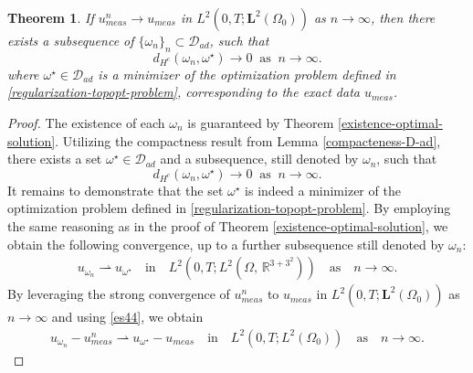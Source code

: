 \documentclass[a4paper,12pt,reqno,natbib]{amsart}
\newtheorem{theorem}{Theorem}
\def\L{\textbf{L}}
\begin{document}
\begin{theorem}\label{theorem-stability} If
$u_{meas}^n \longrightarrow u_{meas}$ in $L^2(0,T;\L^2(\Omega_0))$ as $n\longrightarrow \infty$, then there exists a subsequence of $\{\omega_n\}_n\subset\mathcal{D}_{ad}$, such that
$$d_{H^c}(\omega_n,\omega^\star)\longrightarrow0\;\; \text{as}\;\; n\longrightarrow\infty.$$
where $\omega^\star\in\mathcal{D}_{ad}$ is a minimizer of the optimization problem defined in \eqref{regularization-topopt-problem}, corresponding to the exact data $u_{meas}$.
\end{theorem}

\begin{proof}
The existence of each $\omega_n$ is guaranteed by Theorem \ref{existence-optimal-solution}. Utilizing the compactness result from Lemma \ref{compacteness-D-ad}, there exists a set $\omega^\star\in\mathcal{D}_{ad}$ and a subsequence, still denoted by $\omega_n$, such that
$$d_{H^c}(\omega_n,\omega^\star)\longrightarrow0\;\; \text{as}\;\; n\longrightarrow\infty.$$
It remains to demonstrate that the set $\omega^\star$ is indeed a minimizer of the optimization problem defined in \eqref{regularization-topopt-problem}. By employing the same reasoning as in the proof of Theorem \ref{existence-optimal-solution}, we obtain the following convergence, up to a further subsequence still denoted by $\omega_n$:
\begin{align}\label{es44} u_{\omega_n} \rightharpoonup  u_{\omega^\star} \quad \text{in} \quad L^2(0,T; L^2(\Omega,\,\mathbb{R}^{3+3^2})) \quad \text{as} \quad n \longrightarrow \infty. \end{align}
 By leveraging the strong convergence of $u_{meas}^n$ to $u_{meas}$ in $L^2(0,T;\L^2(\Omega_0))$ as $n\longrightarrow \infty$ and using \eqref{es44}, we obtain
 \begin{align*}
u_{\omega_n}-u_{meas}^n \rightharpoonup  u_{\omega^\star}-u_{meas} \quad \text{in} \quad L^2(0,T; L^2(\Omega_0)) \quad \text{as} \quad n \longrightarrow \infty.
\end{align*}



\end{proof}
\end{document}
